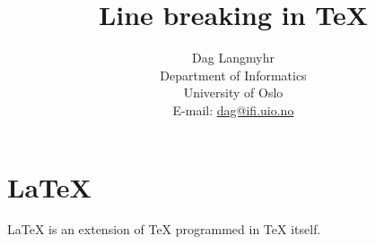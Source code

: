 \documentclass[11pt,a4paper,UKenglish]{article}
\title{Line breaking in \TeX}
\author{Dag Langmyhr\\ Department of Informatics\\
University of Oslo\\ E-mail: \url{dag@ifi.uio.no}}
\begin{document}
\maketitle

\section{\LaTeX}
\begin{refsection}
\LaTeX\cite{LaTeX2} is an extension of
\TeX\cite{TeX-book} programmed in \TeX{} itself.
\end{refsection}
\printbibliography[section=1,title=Bibliography on Introduction]
\printbibliography[section=2,title=Bibliography on \LaTeX]
\end{document}
